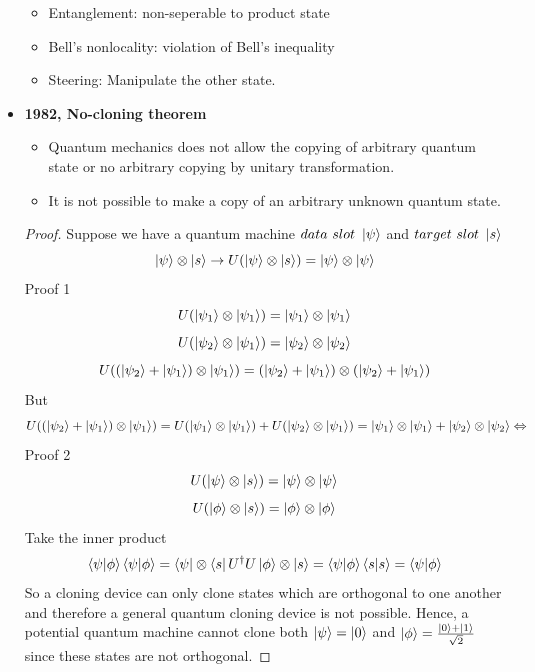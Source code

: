 \documentclass[]{article}
\theoremstyle{nonumberplain}
\begin{document}
\begin{itemize}
\begin{itemize}
	\item Entanglement: non-seperable to product state
	\item Bell's nonlocality: violation of Bell's inequality
	\item Steering: Manipulate the other state.
\end{itemize}
\item \textbf{1982, No-cloning theorem }
\begin{itemize}
	\item Quantum mechanics does not allow the copying of arbitrary quantum state or no arbitrary copying by unitary transformation. \\
	\item It is not possible to make a copy of an arbitrary unknown quantum state.
\end{itemize}
\begin{proof}
Suppose we have a quantum machine $data\ slot\ \ket{\psi}$ and $target\ slot\ \ket{s}$
\[
\ket{\psi}\otimes\ket{s}\rightarrow U(\ket{\psi}\otimes\ket{s})=\ket{\psi}\otimes\ket{\psi}
\] 
Proof 1
\[
	U(\ket{\psi_{1}}\otimes\ket{\psi_{1}})=\ket{\psi_{1}}\otimes\ket{\psi_{1}}
\] 
\[
	U(\ket{\psi_{2}}\otimes\ket{\psi_{1}})=\ket{\psi_{2}}\otimes\ket{\psi_{2}}
\] 
\[
	U((\ket{\psi_{2}}+\ket{\psi_{1}})\otimes\ket{\psi_{1}})=(\ket{\psi_{2}}+\ket{\psi_{1}})\otimes (\ket{\psi_{2}}+\ket{\psi_{1}})
\] 
But
\[
	U((\ket{\psi_{2}}+\ket{\psi_{1}})\otimes\ket{\psi_{1}})=U(\ket{\psi_{1}}\otimes\ket{\psi_{1}}) + U(\ket{\psi_{2}}\otimes\ket{\psi_{1}}) = \ket{\psi_{1}}\otimes\ket{\psi_{1}}+\ket{\psi_{2}}\otimes\ket{\psi_{2}}\Leftrightarrow
\] 
Proof 2
\[
	U(\ket{\psi}\otimes\ket{s}) = \ket{\psi}\otimes \ket{\psi}
\] 
\[
	U(\ket{\phi}\otimes\ket{s}) = \ket{\phi}\otimes \ket{\phi}
\] 
Take the inner product
\[
\braket{\psi|\phi}\braket{\psi|\phi}=\bra{\psi}\otimes\bra{s}U^{\dagger}U\ket{\phi}\otimes\ket{s} = \braket{\psi|\phi}\braket{s|s} = \braket{\psi|\phi}
\] 
So a cloning device can only clone states which are orthogonal to one another and therefore a general quantum cloning device is not possible. Hence, a potential quantum machine cannot clone both $\ket{\psi}=\ket{0}$ and $\ket{\phi}=\frac{\ket{0}+\ket{1}}{\sqrt{2}}$ since these states are not orthogonal.
\end{proof}
\end{itemize}
\end{document}
